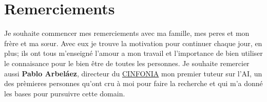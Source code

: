 \chapter*{Remerciements}
Je souhaite commencer mes remerciements avec ma famille, mes peres et mon frère et ma s\oe ur. Avec eux je trouve la motivation pour continuer chaque jour, en plus; ils ont tous m'enseigné l'amour a mon travail et l'importance de bien utiliser le connaisance pour le bien être de toutes les personnes. Je souhaite remercier aussi \textbf{Pablo Arbeláez}, directeur du \href{https://cinfonia.uniandes.edu.co/}{CINFONIA} mon premier tuteur sur l'AI, un des prèmieres personnes qu'ont cru à moi pour faire la recherche et qui m'a donné les bases pour pursuivre cette domain. 

